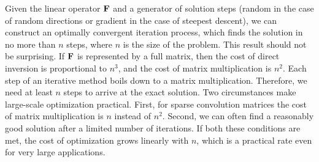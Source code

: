 Given the linear operator $\bold F$ and a generator of solution steps
(random in the case of random directions or gradient in the case of
steepest descent),
we can construct an optimally convergent iteration process,
which finds the solution in no more than $n$ steps,
where $n$ is the size of the problem.
This result should not be surprising.
If $\bold F$ is represented by a full matrix,
then the cost of direct inversion is proportional to $n^3$,
and the cost of matrix multiplication is $n^2$.
Each step of an iterative method boils down to a matrix multiplication.
Therefore, we need at least $n$ steps to arrive at the exact solution.
Two circumstances make large-scale optimization practical.
First, for sparse convolution matrices
the cost of matrix multiplication is $n$ instead of $n^2$.
Second, we can often find a reasonably good solution
after a limited number of iterations.
If both these conditions are met, the cost of optimization
grows linearly with $n$,
which is a practical rate even for very large applications.




